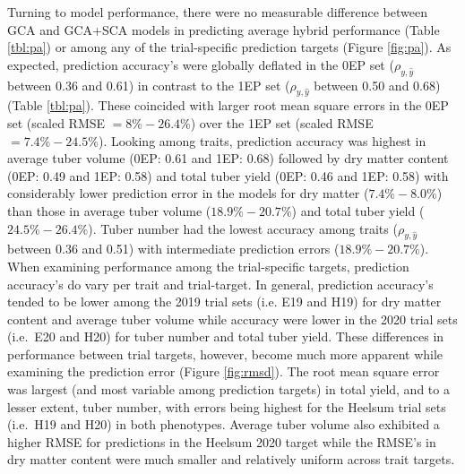 Turning to model performance, there were no measurable difference between GCA and GCA+SCA models in predicting average hybrid performance (Table \ref{tbl:pa}) or among any of the trial-specific prediction targets (Figure \ref{fig:pa}). As expected, prediction accuracy's were globally deflated in the 0EP set (\(\rho_{y,\hat{y}}\) between 0.36 and 0.61) in contrast to the 1EP set (\(\rho_{y,\hat{y}}\) between 0.50 and 0.68) (Table \ref{tbl:pa}). These coincided with larger root mean square errors in the 0EP set (scaled RMSE \(= 8\%-26.4\%\)) over the 1EP set (scaled RMSE \(= 7.4\% - 24.5\%\)). Looking among traits, prediction accuracy was highest in average tuber volume (0EP: 0.61 and 1EP: 0.68) followed by dry matter content (0EP: 0.49 and 1EP: 0.58) and total tuber yield (0EP: 0.46 and 1EP: 0.58) with considerably lower prediction error in the models for dry matter (\(7.4\% - 8.0\%\)) than those in average tuber volume (\(18.9\% - 20.7\%\)) and total tuber yield (\(24.5\% - 26.4\%\)). Tuber number had the lowest accuracy among traits (\(\rho_{y,\hat{y}}\) between 0.36 and 0.51) with intermediate prediction errors (\(18.9\% - 20.7\%\)). When examining performance among the trial-specific targets, prediction accuracy's do vary per trait and trial-target. In general, prediction accuracy's tended to be lower among the 2019 trial sets (i.e. E19 and H19) for dry matter content and average tuber volume while accuracy were lower in the 2020 trial sets (i.e.~E20 and H20) for tuber number and total tuber yield. These differences in performance between trial targets, however, become much more apparent while examining the prediction error (Figure \ref{fig:rmsd}). The root mean square error was largest (and most variable among prediction targets) in total yield, and to a lesser extent, tuber number, with errors being highest for the Heelsum trial sets (i.e.~H19 and H20) in both phenotypes. Average tuber volume also exhibited a higher RMSE for predictions in the Heelsum 2020 target while the RMSE's in dry matter content were much smaller and relatively uniform across trait targets.


